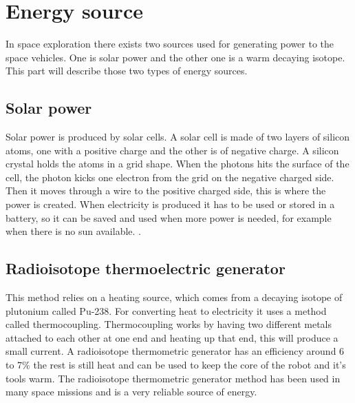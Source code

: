 \section{Energy source}

In space exploration there exists two sources used for generating power to the space vehicles. One is solar power and the other one is a warm decaying isotope. \newline This part will describe those two types of energy sources.

\subsection{Solar power}

Solar power is produced by solar cells. A solar cell is made of two layers of silicon atoms, one with a positive charge and the other is of negative charge. A silicon crystal holds the atoms in a grid shape. When the photons hits the surface of the cell, the photon kicks one electron from the grid on the negative charged side. Then it moves through a wire to the positive charged side, this is where the power is created. When electricity is produced it has to be used or stored in a battery, so it can be saved and used when more power is needed, for example when there is no sun available. \cite{SolarPanels}.

\subsection{Radioisotope thermoelectric generator}

This method relies on a heating source, which comes from a decaying isotope of plutonium called Pu-238. For converting heat to electricity it uses a method called thermocoupling. Thermocoupling works by having two different metals attached to each other at one end and heating up that end, this will produce a small current.
A radioisotope thermometric generator has an efficiency around 6 to 7\% the rest is still heat and can be used to keep the core of the robot and it's tools warm. The radioisotope thermometric generator method has been used in many space missions and is a very reliable source of energy\cite{RTG}.

